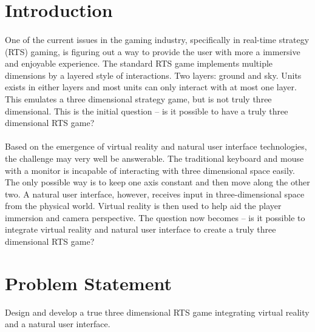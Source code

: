 



\maketitle

\renewcommand{\arraystretch}{1.4}

\section{Introduction}

\paragraph{} One of the current issues in the gaming industry, specifically in real-time strategy (RTS) gaming, is figuring out a way to provide the user with more a immersive and enjoyable experience. The standard RTS game implements multiple dimensions by a layered style of interactions. Two layers: ground and sky. Units exists in either layers and most units can only interact with at most one layer. This emulates a three dimensional strategy game, but is not truly three dimensional. This is the initial question -- is it possible to have a truly three dimensional RTS game?

\paragraph{} Based on the emergence of virtual reality and natural user interface technologies, the challenge may very well be answerable. The traditional keyboard and mouse with a monitor is incapable of interacting with three dimensional space easily. The only possible way is to keep one axis constant and then move along the other two. A natural user interface, however, receives input in three-dimensional space from the physical world. Virtual reality is then used to help aid the player immersion and camera perspective. The question now becomes  -- is it possible to integrate virtual reality and natural user interface to create a truly three dimensional RTS game?

\section{Problem Statement}

Design and develop a true three dimensional RTS game integrating virtual reality and a natural user interface.

